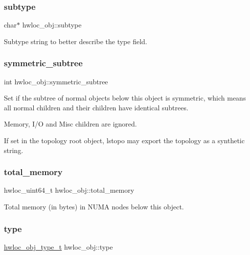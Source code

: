 \subsubsection{\texorpdfstring{subtype}{subtype}}
{\footnotesize\ttfamily char$\ast$ hwloc\+\_\+obj\+::subtype}



Subtype string to better describe the type field. 

\mbox{\label{a00238_a0f41a1d67dc6b661906f2217563637f3}} 
\subsubsection{\texorpdfstring{symmetric\+\_\+subtree}{symmetric\_subtree}}
{\footnotesize\ttfamily int hwloc\+\_\+obj\+::symmetric\+\_\+subtree}



Set if the subtree of normal objects below this object is symmetric, which means all normal children and their children have identical subtrees. 

Memory, I/O and Misc children are ignored.

If set in the topology root object, lstopo may export the topology as a synthetic string. \mbox{\label{a00238_a75603fc36c9284ba48ce814b772a58b6}} 
\subsubsection{\texorpdfstring{total\+\_\+memory}{total\_memory}}
{\footnotesize\ttfamily hwloc\+\_\+uint64\+\_\+t hwloc\+\_\+obj\+::total\+\_\+memory}



Total memory (in bytes) in N\+U\+MA nodes below this object. 

\mbox{\label{a00238_acc4f0803f244867e68fe0036800be5de}} 
\subsubsection{\texorpdfstring{type}{type}}
{\footnotesize\ttfamily \hyperlink{a00184_gacd37bb612667dc437d66bfb175a8dc55}{hwloc\+\_\+obj\+\_\+type\+\_\+t} hwloc\+\_\+obj\+::type}



